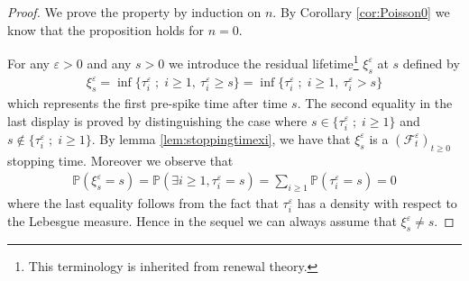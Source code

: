 \documentclass[reqno, 12pt, a4paper]{amsart}
\theoremstyle{plain}
\theoremstyle{definition}
\begin{document}
\begin{proof}
We prove the property by induction on $n$. By Corollary \ref{cor:Poisson0} we know that the proposition holds for $n=0$. 

\medskip

For any $\varepsilon>0$ and any $s>0$ we introduce the residual lifetime{\footnote{This terminology is inherited from renewal theory.}} $\xi_s^\varepsilon$ at $s$ defined by 
\begin{equation}
\begin{split}
\xi_s^\varepsilon = \inf \{ \tau^\varepsilon_i \; ; \; i\ge 1, \ \tau^\varepsilon_i \ge s \} =  \inf \{ \tau^\varepsilon_i \; ; \; i\ge 1, \ \tau^\varepsilon_i > s \}
\end{split}
\end{equation}
which represents the first pre-spike time after time $s$. The second equality in the last display is proved by distinguishing the case where $s \in \{ \tau_i^\varepsilon \; ; \; i \ge 1\}$ and $s \notin \{ \tau_i^\varepsilon \; ; \; i \ge 1\}$. By lemma \ref{lem:stoppingtimexi}, we have that $\xi_s^\varepsilon$ is a $(\mathcal F_t^\varepsilon)_{t \ge 0}$ stopping time. Moreover we observe that
\begin{equation}
\begin{split}
\mathbb P (\xi_s^\varepsilon = s) = \mathbb P ( \exists i \ge 1, \tau_i^\varepsilon =s) = \sum_{i \ge 1} \mathbb P (\tau_i^\varepsilon =s) =0
\end{split}
\end{equation}
where the last equality follows from the fact that $\tau_i^\varepsilon$ has a density with respect to the Lebesgue measure. Hence in the sequel we can always assume that $\xi_s^\varepsilon \ne s$.


\end{proof}
\end{document}

